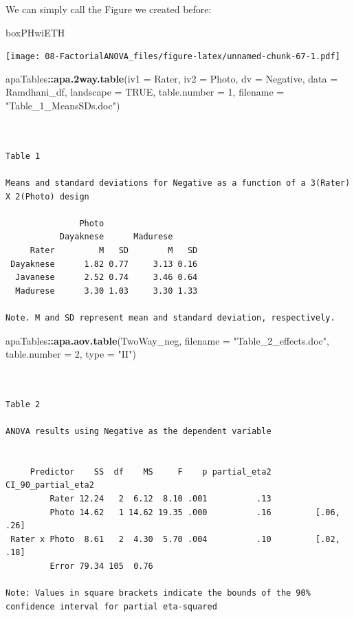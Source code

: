 \documentclass[
  11pt,
]{book}
\newenvironment{Shaded}{\begin{snugshade}}{\end{snugshade}}
\newcommand{\AttributeTok}[1]{\textcolor[rgb]{0.27,0.27,0.27}{#1}}
\newcommand{\ConstantTok}[1]{\textcolor[rgb]{0.37,0.37,0.37}{#1}}
\newcommand{\DecValTok}[1]{\textcolor[rgb]{0.06,0.06,0.06}{#1}}
\newcommand{\FunctionTok}[1]{\textcolor[rgb]{0.27,0.27,0.27}{\textbf{#1}}}
\newcommand{\NormalTok}[1]{#1}
\newcommand{\SpecialCharTok}[1]{\textcolor[rgb]{0.43,0.43,0.43}{\textbf{#1}}}
\newcommand{\StringTok}[1]{\textcolor[rgb]{0.5,0.5,0.5}{#1}}
\begin{document}
We can simply call the Figure we created before:

\begin{Shaded}
\begin{Highlighting}[]
\NormalTok{boxPHwiETH}
\end{Highlighting}
\end{Shaded}

\texttt{[image: 08-FactorialANOVA\_files/figure-latex/unnamed-chunk-67-1.pdf]}

\begin{Shaded}
\begin{Highlighting}[]
\NormalTok{apaTables}\SpecialCharTok{::}\FunctionTok{apa.2way.table}\NormalTok{(}\AttributeTok{iv1 =}\NormalTok{ Rater, }\AttributeTok{iv2 =}\NormalTok{ Photo, }\AttributeTok{dv =}\NormalTok{ Negative, }\AttributeTok{data =}\NormalTok{ Ramdhani\_df,}
    \AttributeTok{landscape =} \ConstantTok{TRUE}\NormalTok{, }\AttributeTok{table.number =} \DecValTok{1}\NormalTok{, }\AttributeTok{filename =} \StringTok{"Table\_1\_MeansSDs.doc"}\NormalTok{)}
\end{Highlighting}
\end{Shaded}

\begin{verbatim}


Table 1 

Means and standard deviations for Negative as a function of a 3(Rater) X 2(Photo) design 

               Photo                   
           Dayaknese      Madurese     
     Rater         M   SD        M   SD
 Dayaknese      1.82 0.77     3.13 0.16
  Javanese      2.52 0.74     3.46 0.64
  Madurese      3.30 1.03     3.30 1.33

Note. M and SD represent mean and standard deviation, respectively. 
\end{verbatim}

\begin{Shaded}
\begin{Highlighting}[]
\NormalTok{apaTables}\SpecialCharTok{::}\FunctionTok{apa.aov.table}\NormalTok{(TwoWay\_neg, }\AttributeTok{filename =} \StringTok{"Table\_2\_effects.doc"}\NormalTok{,}
    \AttributeTok{table.number =} \DecValTok{2}\NormalTok{, }\AttributeTok{type =} \StringTok{"II"}\NormalTok{)}
\end{Highlighting}
\end{Shaded}

\begin{verbatim}


Table 2 

ANOVA results using Negative as the dependent variable
 

     Predictor    SS  df    MS     F    p partial_eta2 CI_90_partial_eta2
         Rater 12.24   2  6.12  8.10 .001          .13                   
         Photo 14.62   1 14.62 19.35 .000          .16         [.06, .26]
 Rater x Photo  8.61   2  4.30  5.70 .004          .10         [.02, .18]
         Error 79.34 105  0.76                                           

Note: Values in square brackets indicate the bounds of the 90% confidence interval for partial eta-squared 
\end{verbatim}
\end{document}
